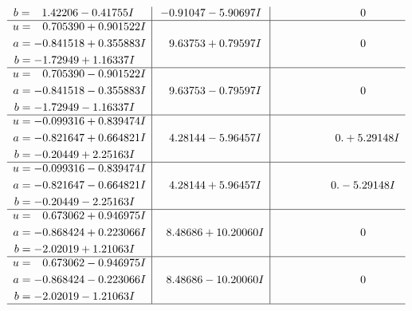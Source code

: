 \documentclass[1p]{elsarticle_modified}
\theoremstyle{definition}
\begin{document}
$$\begin{array}{c|c|c}
\begin{aligned}
b &= \phantom{-}1.42206 - 0.41755 I\end{aligned}
 & -0.91047 - 5.90697 I & \phantom{-0.000000 } 0 \\ \hline\begin{aligned}
u &= \phantom{-}0.705390 + 0.901522 I \\
a &= -0.841518 + 0.355883 I \\
b &= -1.72949 + 1.16337 I\end{aligned}
 & \phantom{-}9.63753 + 0.79597 I & \phantom{-0.000000 } 0 \\ \hline\begin{aligned}
u &= \phantom{-}0.705390 - 0.901522 I \\
a &= -0.841518 - 0.355883 I \\
b &= -1.72949 - 1.16337 I\end{aligned}
 & \phantom{-}9.63753 - 0.79597 I & \phantom{-0.000000 } 0 \\ \hline\begin{aligned}
u &= -0.099316 + 0.839474 I \\
a &= -0.821647 + 0.664821 I \\
b &= -0.20449 + 2.25163 I\end{aligned}
 & \phantom{-}4.28144 - 5.96457 I & \phantom{-0.000000 -}0. + 5.29148 I \\ \hline\begin{aligned}
u &= -0.099316 - 0.839474 I \\
a &= -0.821647 - 0.664821 I \\
b &= -0.20449 - 2.25163 I\end{aligned}
 & \phantom{-}4.28144 + 5.96457 I & \phantom{-0.000000 } 0. - 5.29148 I \\ \hline\begin{aligned}
u &= \phantom{-}0.673062 + 0.946975 I \\
a &= -0.868424 + 0.223066 I \\
b &= -2.02019 + 1.21063 I\end{aligned}
 & \phantom{-}8.48686 + 10.20060 I & \phantom{-0.000000 } 0 \\ \hline\begin{aligned}
u &= \phantom{-}0.673062 - 0.946975 I \\
a &= -0.868424 - 0.223066 I \\
b &= -2.02019 - 1.21063 I\end{aligned}
 & \phantom{-}8.48686 - 10.20060 I & \phantom{-0.000000 } 0\\
 \hline 
 \end{array}$$\newpage$$\begin{array}{c|c|c}  

\end{array}$$
\end{document}
